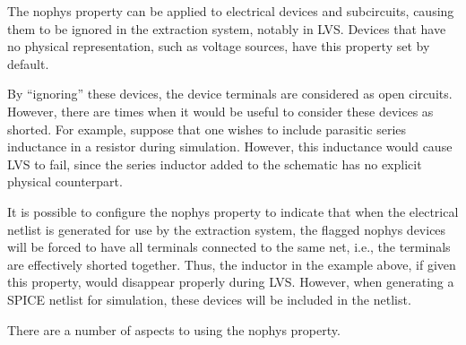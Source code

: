 The {\et nophys} property can be applied to electrical devices and
subcircuits, causing them to be ignored in the extraction system,
notably in LVS.  Devices that have no physical representation, such as
voltage sources, have this property set by default.

By ``ignoring'' these devices, the device terminals are considered as
open circuits.  However, there are times when it would be useful to
consider these devices as shorted.  For example, suppose that one
wishes to include parasitic series inductance in a resistor during
simulation.  However, this inductance would cause LVS to fail, since
the series inductor added to the schematic has no explicit physical
counterpart.

It is possible to configure the {\et nophys} property to indicate that
when the electrical netlist is generated for use by the extraction
system, the flagged {\et nophys} devices will be forced to have all
terminals connected to the same net, i.e., the terminals are
effectively shorted together.  Thus, the inductor in the example
above, if given this property, would disappear properly during LVS. 
However, when generating a SPICE netlist for simulation, these devices
will be included in the netlist.

There are a number of aspects to using the {\et nophys} property.

